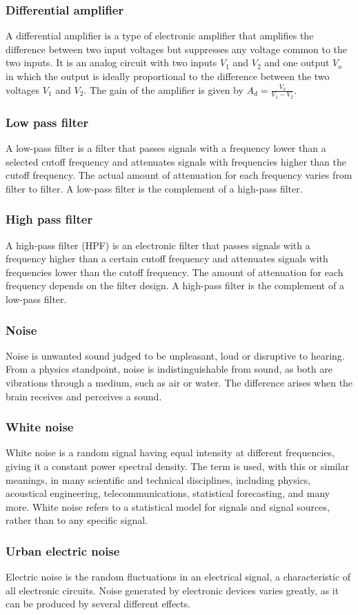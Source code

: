 \subsubsection{Differential amplifier}
A differential amplifier is a type of electronic amplifier that amplifies the difference between two input voltages but suppresses any voltage common to the two inputs. It is an analog circuit with two inputs $V_{1}$ and $V_{2}$ and one output $V_{o}$ in which the output is ideally proportional to the difference between the two voltages $V_{1}$ and $V_{2}$. The gain of the amplifier is given by $A_{d} = \frac{V_{o}}{V_{1} - V_{2}}$.
\\
\subsubsection{Low pass filter}
A low-pass filter is a filter that passes signals with a frequency lower than a selected cutoff frequency and attenuates signals with frequencies higher than the cutoff frequency. The actual amount of attenuation for each frequency varies from filter to filter. A low-pass filter is the complement of a high-pass filter.
\\
\subsubsection{High pass filter}
A high-pass filter (HPF) is an electronic filter that passes signals with a frequency higher than a certain cutoff frequency and attenuates signals with frequencies lower than the cutoff frequency. The amount of attenuation for each frequency depends on the filter design. A high-pass filter is the complement of a low-pass filter.
\\
\subsubsection{Noise}
Noise is unwanted sound judged to be unpleasant, loud or disruptive to hearing. From a physics standpoint, noise is indistinguishable from sound, as both are vibrations through a medium, such as air or water. The difference arises when the brain receives and perceives a sound.
\\
\subsubsection{White noise}
White noise is a random signal having equal intensity at different frequencies, giving it a constant power spectral density. The term is used, with this or similar meanings, in many scientific and technical disciplines, including physics, acoustical engineering, telecommunications, statistical forecasting, and many more. White noise refers to a statistical model for signals and signal sources, rather than to any specific signal.
\\
\subsubsection{Urban electric noise}
Electric noise is the random fluctuations in an electrical signal, a characteristic of all electronic circuits. Noise generated by electronic devices varies greatly, as it can be produced by several different effects.

